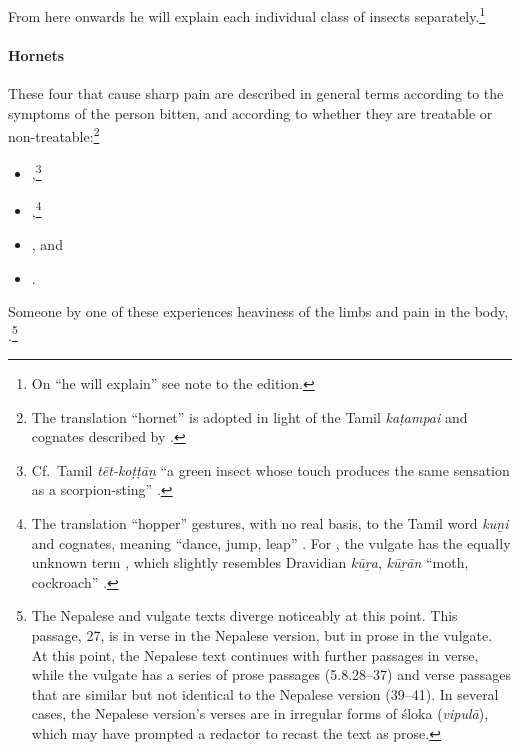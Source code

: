 \begin{translation}
\item[25cd] 
\label{ekajati}
From here onwards he will explain each individual class of insects
separately.\footnote{On  “he will explain” see note to
    the edition.}

\paragraph{Hornets}
\item[26]

These four  that cause sharp pain are described
in general terms according to the symptoms of the person bitten, and
according to whether they are treatable or non-treatable:\footnote{The
    translation “hornet” is adopted in light of the Tamil \emph{kaṭampai}
    and cognates described by \cite[\#1117]{DED}.}
\begin{itemize}
    \item {},\footnote{Cf.\ Tamil 
    \emph{t\={e}t-koṭṭā\b{n}} “a green insect whose touch produces the same 
    sensation as a scorpion-sting” \citep[\#2064]{DED}.} 
    \item {},\footnote{The translation “hopper” gestures,
	    with no real basis, to the Tamil word \emph{ku\b{n}i} and cognates,
    meaning “dance, jump, leap” \citep[\#1863]{DED}. For ,
    the vulgate has the equally unknown term , which slightly 
    resembles Dravidian \emph{kū\b{r}a}, \emph{kū\b{r}ān} “moth, cockroach” 
    \citep[\#1926]{DED}.}
     \item    {}, and \item {}.
\end{itemize}

\item[27]

Someone  by one of these experiences heaviness of the limbs 
and pain in the 
body, .\footnote{The 
Nepalese and vulgate texts diverge noticeably at this point.  This passage, 27, is in 
verse in the Nepalese version, but in prose in the vulgate.  At this 
point, the Nepalese text continues with further passages in verse, while 
the vulgate has a series of prose passages (5.8.28--37) and verse passages that are 
similar but not identical to the Nepalese version (39--41).  In several cases, 
the Nepalese version's verses are in irregular forms of śloka (\emph{vipulā}), 
which may have prompted a redactor to recast the text as prose.}


\end{translation}
